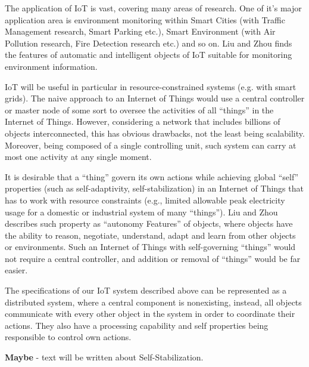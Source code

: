 \documentclass[../main/Self-Stabilization.tex]{subfiles}
\begin{document}
The application of IoT is vast, covering many areas of research. One of it's major application area is environment monitoring within Smart Cities (with Traffic Management research, Smart Parking etc.), Smart Environment (with Air Pollution research, Fire Detection research etc.) and so on. Liu and Zhou \cite{IoT6150221} finds the features of automatic and intelligent objects of IoT suitable for monitoring environment information.

IoT will be useful in particular in resource-constrained systems (e.g. with smart grids). The naive approach to an Internet of Things would use a central controller or master node of some sort to oversee the activities of all ``things'' in the Internet of Things. However, considering a network that includes billions of objects interconnected, this has obvious drawbacks, not the least being scalability. Moreover, being composed of a single controlling unit, such system can carry at most one activity at any single moment.

It is desirable that a ``thing'' govern its own actions while achieving global ``self'' properties (such as self-adaptivity, self-stabilization) in an Internet of Things that has to work with resource constraints (e.g., limited allowable peak electricity usage for a domestic or industrial system of many ``things''). Liu and Zhou \cite{IoT6150221} describes such property as ``autonomy Features'' of objects, where objects have the ability to reason, negotiate, understand, adapt and learn from other objects or environments. Such an Internet of Things with self-governing ``things'' would not require a central controller, and addition or removal of ``things'' would be far easier.

The specifications of our IoT system described above can be represented as a distributed system, where a central component is nonexisting, instead, all objects communicate with every other object in the system in order to coordinate their actions. They also have a processing capability and self properties being responsible to control own actions.


\textbf{Maybe} - text will be written about Self-Stabilization.
\end{document}
